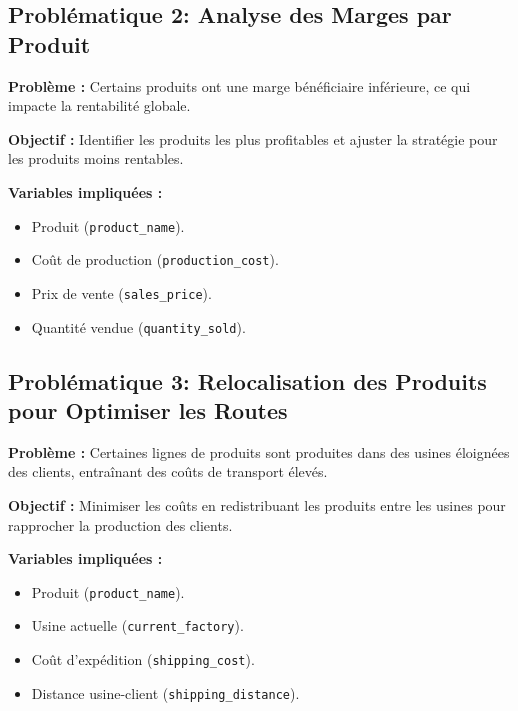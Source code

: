 \documentclass{article}
\begin{document}
\subsection{Problématique 2: Analyse des Marges par Produit}

\textbf{Problème :} Certains produits ont une marge bénéficiaire inférieure, ce qui impacte la rentabilité globale.

\textbf{Objectif :} Identifier les produits les plus profitables et ajuster la stratégie pour les produits moins rentables.

\textbf{Variables impliquées :}
\begin{itemize}
    \item Produit (\texttt{product\_name}).
    \item Coût de production (\texttt{production\_cost}).
    \item Prix de vente (\texttt{sales\_price}).
    \item Quantité vendue (\texttt{quantity\_sold}).
\end{itemize}

\subsection{Problématique 3: Relocalisation des Produits pour Optimiser les Routes}

\textbf{Problème :} Certaines lignes de produits sont produites dans des usines éloignées des clients, entraînant des coûts de transport élevés.

\textbf{Objectif :} Minimiser les coûts en redistribuant les produits entre les usines pour rapprocher la production des clients.

\textbf{Variables impliquées :}
\begin{itemize}
    \item Produit (\texttt{product\_name}).
    \item Usine actuelle (\texttt{current\_factory}).
    \item Coût d’expédition (\texttt{shipping\_cost}).
    \item Distance usine-client (\texttt{shipping\_distance}).
\end{itemize}






\end{document}
